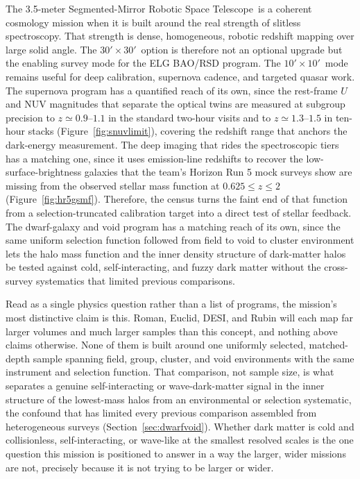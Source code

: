 \documentclass[10pt,onecolumn]{article}
\newcommand{\facility}{3.5-meter Segmented-Mirror Robotic Space Telescope}
\newcommand{\fovsmall}{$10'\!\times10'$}
\newcommand{\fovlarge}{$30'\!\times30'$}
\begin{document}
The \facility\ is a coherent cosmology mission when it is built around the real strength of slitless spectroscopy. That strength is dense, homogeneous, robotic redshift mapping over large solid angle. The \fovlarge\ option is therefore not an optional upgrade but the enabling survey mode for the ELG BAO/RSD program. The \fovsmall\ mode remains useful for deep calibration, supernova cadence, and targeted quasar work. The supernova program has a quantified reach of its own, since the rest-frame $U$ and NUV magnitudes that separate the optical twins are measured at subgroup precision to $z\simeq0.9$--$1.1$ in the standard two-hour visits and to $z\simeq1.3$--$1.5$ in ten-hour stacks (Figure~\ref{fig:snuvlimit}), covering the redshift range that anchors the dark-energy measurement. The deep imaging that rides the spectroscopic tiers has a matching one, since it uses emission-line redshifts to recover the low-surface-brightness galaxies that the team's Horizon Run 5 mock surveys show are missing from the observed stellar mass function at $0.625\le z\le2$ (Figure~\ref{fig:hr5gsmf}). Therefore, the census turns the faint end of that function from a selection-truncated calibration target into a direct test of stellar feedback. The dwarf-galaxy and void program has a matching reach of its own, since the same uniform selection function followed from field to void to cluster environment lets the halo mass function and the inner density structure of dark-matter halos be tested against cold, self-interacting, and fuzzy dark matter without the cross-survey systematics that limited previous comparisons.

Read as a single physics question rather than a list of programs, the mission's most distinctive claim is this. Roman, Euclid, DESI, and Rubin will each map far larger volumes and much larger samples than this concept, and nothing above claims otherwise. None of them is built around one uniformly selected, matched-depth sample spanning field, group, cluster, and void environments with the same instrument and selection function. That comparison, not sample size, is what separates a genuine self-interacting or wave-dark-matter signal in the inner structure of the lowest-mass halos from an environmental or selection systematic, the confound that has limited every previous comparison assembled from heterogeneous surveys (Section~\ref{sec:dwarfvoid}). Whether dark matter is cold and collisionless, self-interacting, or wave-like at the smallest resolved scales is the one question this mission is positioned to answer in a way the larger, wider missions are not, precisely because it is not trying to be larger or wider.
\end{document}

